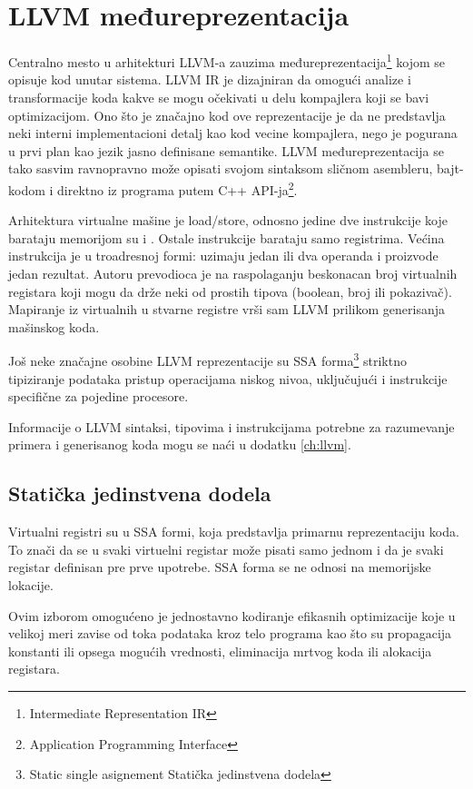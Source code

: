 \section{LLVM međureprezentacija}

Centralno mesto u arhitekturi LLVM-a\cite{aosa} zauzima međureprezentacija\footnote{\eng Intermediate Representation \ndash IR} 
kojom se opisuje kod unutar sistema. 
LLVM IR je dizajniran da omogući analize i transformacije koda kakve se mogu očekivati u delu kompajlera koji se bavi optimizacijom. 
Ono što je značajno kod ove reprezentacije je da ne predstavlja neki interni implementacioni detalj kao kod vecine kompajlera, 
nego je pogurana u prvi plan kao jezik jasno definisane semantike. 
LLVM međureprezentacija se tako sasvim ravnopravno može opisati svojom sintaksom sličnom asembleru, 
bajt-kodom i direktno iz programa putem C++ API-ja\footnote{\eng Application Programming Interface}.

Arhitektura virtualne mašine je load/store, odnosno jedine dve instrukcije koje barataju memorijom su  i . 
Ostale instrukcije barataju samo registrima.
Većina instrukcija je u troadresnoj formi: uzimaju jedan ili dva operanda i proizvode jedan rezultat.
Autoru prevodioca je na raspolaganju beskonacan broj virtualnih registara koji mogu da drže neki od prostih tipova (boolean, broj ili pokazivač). Mapiranje iz virtualnih u stvarne registre vrši sam LLVM prilikom generisanja mašinskog koda.

Još neke značajne osobine LLVM reprezentacije su 
SSA forma\footnote{\skr \eng Static single asignement \ndash Statička jedinstvena dodela}
striktno tipiziranje podataka
pristup operacijama niskog nivoa, uključujući i instrukcije specifične za pojedine procesore.

Informacije o LLVM sintaksi, tipovima i instrukcijama potrebne za razumevanje primera i generisanog koda mogu se naći u dodatku \ref{ch:llvm}.

\subsection*{Statička jedinstvena dodela}

Virtualni registri su u SSA formi, koja predstavlja primarnu reprezentaciju koda.
To znači da se u svaki virtuelni registar može pisati samo jednom i da je svaki registar definisan pre prve upotrebe.
SSA forma se ne odnosi na memorijske lokacije.

Ovim izborom omogućeno je jednostavno kodiranje efikasnih optimizacije koje u velikoj meri zavise od toka podataka kroz telo programa kao što su propagacija konstanti ili opsega mogućih vrednosti, eliminacija mrtvog koda ili alokacija registara.


